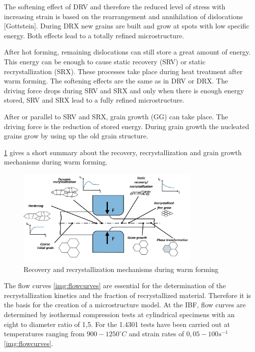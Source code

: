 The softening effect of DRV and therefore the reduced level of stress with increasing strain is based on the rearrangement and annihilation of dislocations [Gottstein]. During DRX new grains are built and grow at spots with low specific energy. Both effects lead to a totally refined microstructure.\par

After hot forming, remaining dislocations can still store a great amount of energy. This energy can be enough to cause static recovery (SRV) or static recrystallization (SRX). These processes take place during heat treatment after warm forming. The softening effects are the same as in DRV or DRX. The driving force drops during SRV and SRX and only when there is enough energy stored, SRV and SRX lead to a fully refined microstructure.\par 

After or parallel to SRV and SRX, grain growth (GG) can take place. The driving force is the reduction of stored energy. During grain growth the nucleated grains grow by using up the old grain structure.\par 

\ref{img:recovandrecrystwarmforming} gives a short summary about the recovery, recrystallization and grain growth mechanisms during warm forming.

\begin{figure}[htbp]
 \centering
 \includegraphics[width=0.8\textwidth]{images/recovandrecrystwarmforming}
 \caption{Recovery and recrystallization mechanisms during warm forming}
 \label{img:recovandrecrystwarmforming}
\end{figure}

The flow curves \ref{img:flowcurves} are essential for the determination of the recrystallization kinetics and the fraction of recrystallized material. Therefore it is the basis for the creation of a microstructure model. At the IBF, flow curves are determined by isothermal compression tests at cylindrical specimens with an eight to diameter ratio of 1,5. For the 1.4301 tests have been carried out at temperatures ranging from $900 - 1250 ^{\circ}C$ and strain rates of $0,05 - 100 s^{-1}$ \ref{img:flowcurves}.

